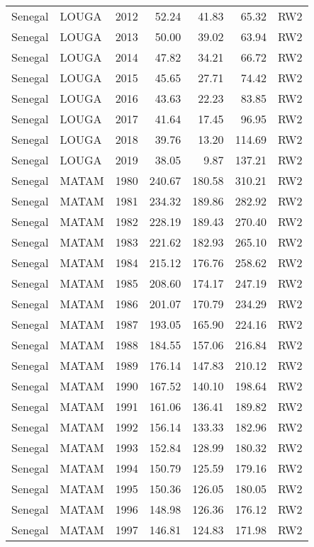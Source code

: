 \begin{longtable}{lllrrrl}
  Senegal & LOUGA & 2012 & 52.24 & 41.83 & 65.32 & RW2 \\ 
  Senegal & LOUGA & 2013 & 50.00 & 39.02 & 63.94 & RW2 \\ 
  Senegal & LOUGA & 2014 & 47.82 & 34.21 & 66.72 & RW2 \\ 
  Senegal & LOUGA & 2015 & 45.65 & 27.71 & 74.42 & RW2 \\ 
  Senegal & LOUGA & 2016 & 43.63 & 22.23 & 83.85 & RW2 \\ 
  Senegal & LOUGA & 2017 & 41.64 & 17.45 & 96.95 & RW2 \\ 
  Senegal & LOUGA & 2018 & 39.76 & 13.20 & 114.69 & RW2 \\ 
  Senegal & LOUGA & 2019 & 38.05 & 9.87 & 137.21 & RW2 \\ 
  Senegal & MATAM & 1980 & 240.67 & 180.58 & 310.21 & RW2 \\ 
  Senegal & MATAM & 1981 & 234.32 & 189.86 & 282.92 & RW2 \\ 
  Senegal & MATAM & 1982 & 228.19 & 189.43 & 270.40 & RW2 \\ 
  Senegal & MATAM & 1983 & 221.62 & 182.93 & 265.10 & RW2 \\ 
  Senegal & MATAM & 1984 & 215.12 & 176.76 & 258.62 & RW2 \\ 
  Senegal & MATAM & 1985 & 208.60 & 174.17 & 247.19 & RW2 \\ 
  Senegal & MATAM & 1986 & 201.07 & 170.79 & 234.29 & RW2 \\ 
  Senegal & MATAM & 1987 & 193.05 & 165.90 & 224.16 & RW2 \\ 
  Senegal & MATAM & 1988 & 184.55 & 157.06 & 216.84 & RW2 \\ 
  Senegal & MATAM & 1989 & 176.14 & 147.83 & 210.12 & RW2 \\ 
  Senegal & MATAM & 1990 & 167.52 & 140.10 & 198.64 & RW2 \\ 
  Senegal & MATAM & 1991 & 161.06 & 136.41 & 189.82 & RW2 \\ 
  Senegal & MATAM & 1992 & 156.14 & 133.33 & 182.96 & RW2 \\ 
  Senegal & MATAM & 1993 & 152.84 & 128.99 & 180.32 & RW2 \\ 
  Senegal & MATAM & 1994 & 150.79 & 125.59 & 179.16 & RW2 \\ 
  Senegal & MATAM & 1995 & 150.36 & 126.05 & 180.05 & RW2 \\ 
  Senegal & MATAM & 1996 & 148.98 & 126.36 & 176.12 & RW2 \\ 
  Senegal & MATAM & 1997 & 146.81 & 124.83 & 171.98 & RW2 \\ 

\end{longtable}

